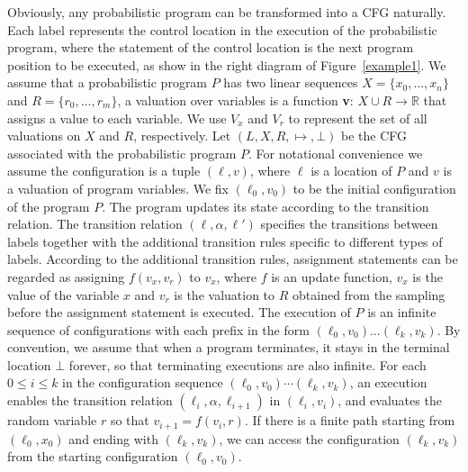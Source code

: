 \documentclass[runningheads]{llncs}
\newcommand\yx[1]{{\color{red} [YD: #1]}}
\begin{document}
Obviously, any probabilistic program can be transformed into a CFG naturally. Each label represents the control location in the execution of the probabilistic program, where the statement of the control location is the next program position to be executed, as show in the right diagram of Figure~\ref{example1}. 
We assume that a probabilistic program $P$ has two linear sequences $X=\{x_0,\dots,x_{n}\}$ and $R=\{r_0,\dots,r_{m}\}$, a valuation over variables is a function \textbf{v}: $X\cup R \to \mathbb{R}$ that assigns a value to each variable. We use $V_x$ and $V_r$ to represent the set of all valuations on $X$ and $R$, respectively. 
Let $(L,X,R,\mapsto,\bot)$ be the CFG associated with the probabilistic program $P$. For notational convenience we assume the configuration is a tuple $(\ell, v)$, where $\ell$ is a location of $P$ and $v$ is a valuation of program variables.
We fix $(\ell_0, v_0)$ to be the initial configuration of the program $P$. The program updates its state according to the transition relation. The transition relation $(\ell,\alpha,\ell')$ specifies the transitions between labels together with the additional transition rules specific to different types of labels.
According to the additional transition rules, assignment statements can be regarded as assigning $f(v_x,v_r)$ to $v_x$, where $f$ is an update function, $v_x$ is the value of the variable $x$ and $v_r$ is the valuation to $R$ obtained from the sampling before the assignment statement is executed.
The execution of $P$ is an infinite
sequence of configurations with each prefix in the form $(\ell_0, v_0) \dots (\ell_k, v_k)$. By convention, we assume that when a program terminates, it stays in the terminal location $\bot$ forever, so that terminating executions are also infinite. %
For each $0\leq i\leq k$ in the configuration sequence $(\ell_0,v_0) \cdots (\ell_k, v_k)$, an execution enables the transition relation $(\ell_i, \alpha, \ell_{i+1})$ in $(\ell_i, v_i)$, and evaluates the random variable $r$ so that $v_{i+1}=f(v_i,r)$. If there is a finite path starting from $(\ell_0, x_0)$ and ending with $(\ell_k, v_k)$, we can access the configuration $(\ell_k, v_k)$ from the starting configuration $(\ell_0, v_0)$. 
\end{document}
